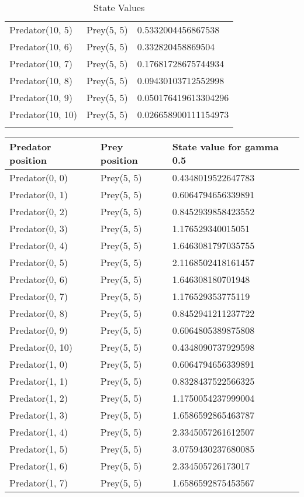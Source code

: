 \begin{longtable}{| p{} | p{} | p{} |}
Predator(10, 5) & Prey(5, 5) &0.5332004456867538\\
Predator(10, 6) & Prey(5, 5) &0.332820458869504\\
Predator(10, 7) & Prey(5, 5) &0.17681728675744934\\
Predator(10, 8) & Prey(5, 5) &0.09430103712552998\\
Predator(10, 9) & Prey(5, 5) &0.050176419613304296\\
Predator(10, 10) & Prey(5, 5) &0.026658900111154973\\
\caption{State Values} 
\label{tab:myfirstlongtable}
\end{longtable}

\begin{longtable}{| p{} | p{} | p{} |} 
   Predator position & Prey position & State value for gamma 0.5 \\
    \hline
Predator(0, 0) & Prey(5, 5) &0.4348019522647783\\
Predator(0, 1) & Prey(5, 5) &0.6064794656339891\\
Predator(0, 2) & Prey(5, 5) &0.8452939858423552\\
Predator(0, 3) & Prey(5, 5) &1.176529340015051\\
Predator(0, 4) & Prey(5, 5) &1.6463081797035755\\
Predator(0, 5) & Prey(5, 5) &2.1168502418161457\\
Predator(0, 6) & Prey(5, 5) &1.646308180701948\\
Predator(0, 7) & Prey(5, 5) &1.176529353775119\\
Predator(0, 8) & Prey(5, 5) &0.8452941211237722\\
Predator(0, 9) & Prey(5, 5) &0.6064805389875808\\
Predator(0, 10) & Prey(5, 5) &0.4348090737929598\\
Predator(1, 0) & Prey(5, 5) &0.6064794656339891\\
Predator(1, 1) & Prey(5, 5) &0.8328437522566325\\
Predator(1, 2) & Prey(5, 5) &1.1750054237999004\\
Predator(1, 3) & Prey(5, 5) &1.6586592865463787\\
Predator(1, 4) & Prey(5, 5) &2.3345057261612507\\
Predator(1, 5) & Prey(5, 5) &3.0759430237680085\\
Predator(1, 6) & Prey(5, 5) &2.334505726173017\\
Predator(1, 7) & Prey(5, 5) &1.6586592875453567\\

\end{longtable}
